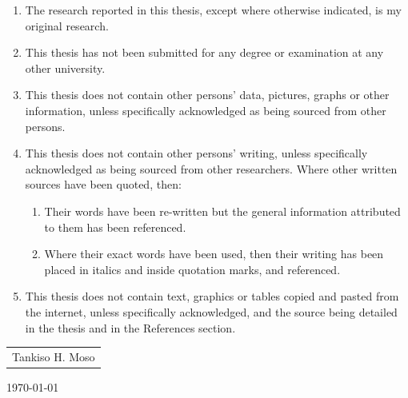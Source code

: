 \documentclass[12pt,a4paper]{report}
\begin{document}
\begin{enumerate}
	\item The research reported in this thesis, except where otherwise indicated, is my original research.
	\item This thesis has not been submitted for any degree or examination at any other university.
	\item This thesis does not contain other persons’ data, pictures, graphs or other information, unless specifically acknowledged as being sourced from other persons.
	\item This thesis does not contain other persons' writing, unless specifically acknowledged as being sourced from other researchers.  Where other written sources have been quoted, then:
\begin{enumerate}
	\item Their words have been re-written but the general information attributed to them has been referenced.
	\item Where their exact words have been used, then their writing has been placed in italics and inside quotation marks, and referenced.
\end{enumerate}
		
	\item This thesis does not contain text, graphics or tables copied and pasted from the internet, unless specifically acknowledged, and the source being detailed in the thesis and in the References section.
\end{enumerate}
\vspace{0.5cm}
	
\begin{table}[h]
\begin{tabular}{c}
\hline
Tankiso H. Moso\\
\end{tabular}
\end{table}	
{\large \today}\\ %

\newpage


\newpage



\newpage
\renewcommand\contentsname{Table of Contents} %
\tableofcontents\newpage %

	








   
{}
    
\end{document}
